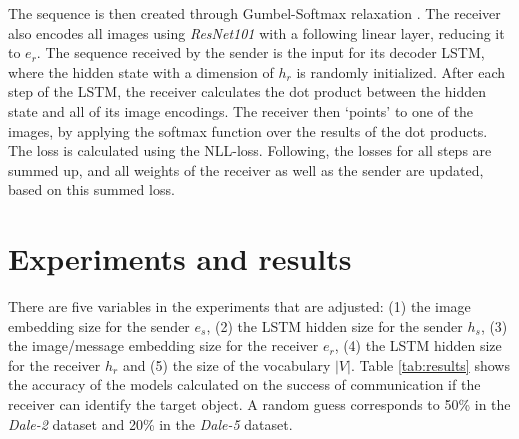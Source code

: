 \documentclass[11pt]{article}
\begin{document}
The sequence is then created through Gumbel-Softmax relaxation \citep{Jang2016}.
%
The receiver also encodes all images using \emph{ResNet101} with a following linear layer, reducing it to $e_r$.
The sequence received by the sender is the input for its decoder LSTM, where the hidden state with a dimension of $h_r$ is randomly initialized.
After each step of the LSTM, the receiver calculates the dot product between the hidden state and all of its image encodings.
The receiver then `points' to one of the images, by applying the softmax function over the results of the dot products.
The loss is calculated using the NLL-loss.
Following, the losses for all steps are summed up, and all weights of the receiver as well as the sender are updated, based on this summed loss.

\section{Experiments and results}

There are five variables in the experiments that are adjusted:
(1) the image embedding size for the sender $e_s$, (2) the LSTM hidden size for the sender $h_s$, (3) the image/message embedding size for the receiver $e_r$, (4) the LSTM hidden size for the receiver $h_r$ and (5) the size of the vocabulary $|V|$.
%
Table \ref{tab:results} shows the accuracy of the models calculated on the success of communication if the receiver can identify the target object.
A random guess corresponds to 50\% in the \emph{Dale-2} dataset and 20\% in the \emph{Dale-5} dataset.


\end{document}
